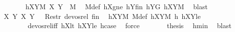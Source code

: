 \begin{isabellebody}
\ \ \ \ \isamarkupfalse%
\ \isamarkupfalse%
\ hXY{}M{\isacharcolon}{\kern0pt}\ {\isachardoublequoteopen}{\isacharparenleft}{\kern0pt}{\isacharquery}{\kern0pt}X{}{\isacharcomma}{\kern0pt}\ {\isacharquery}{\kern0pt}Y{}{\isacharparenright}{\kern0pt}\ {\isasymin}\ M{\isachardoublequoteclose}\ \isamarkupfalse%
\ M{\isacharunderscore}{\kern0pt}def\ hXgne\ hY{}fin\ hY{}G\ hXYM\ \isamarkupfalse%
\ blast\isanewline
\ \ \ \ \isamarkupfalse%
\ \isamarkupfalse%
\ {\isachardoublequoteopen}{\isacharparenleft}{\kern0pt}{\isacharparenleft}{\kern0pt}{\isacharquery}{\kern0pt}X{}{\isacharcomma}{\kern0pt}\ {\isacharquery}{\kern0pt}Y{}{\isacharparenright}{\kern0pt}{\isacharcomma}{\kern0pt}\ {\isacharparenleft}{\kern0pt}X{\isacharcomma}{\kern0pt}\ Y{\isacharparenright}{\kern0pt}{\isacharparenright}{\kern0pt}\ {\isasymin}\ \ Restr\ devos{\isacharunderscore}{\kern0pt}rel\ {\isacharquery}{\kern0pt}fin{\isachardoublequoteclose}\ \isamarkupfalse%
\ hXYM\ M{\isacharunderscore}{\kern0pt}def\ hXY{}M\ h\ hXY{}le\ \isanewline
\ \ \ \ \ \ \ \ devos{\isacharunderscore}{\kern0pt}rel{\isacharunderscore}{\kern0pt}iff\ hX{}lt\ hXY{}le\ hcase\ \isamarkupfalse%
\ force\isanewline
\ \ \ \ \isamarkupfalse%
\ \isamarkupfalse%
\ {\isacharquery}{\kern0pt}thesis\ \isamarkupfalse%
\ hmin\ \isamarkupfalse%
\ blast\isanewline
\ \ \isamarkupfalse%
\isanewline
{}\isamarkupfalse%
%
\endisatagproof
{\isafoldproof}%
%
\isadelimproof
\isanewline
%
\endisadelimproof
%
\isadelimtheory
\isanewline
%
\endisadelimtheory
%
\isatagtheory
{}\isamarkupfalse%
%
\endisatagtheory
{\isafoldtheory}%
%
\isadelimtheory
%
\endisadelimtheory
%
\end{isabellebody}%
\endinput
